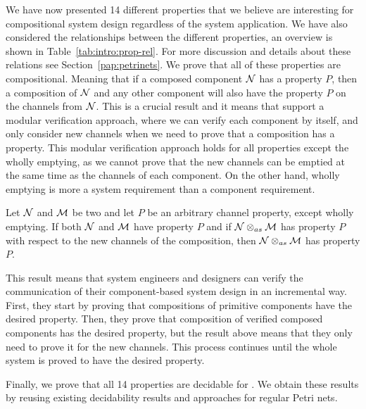 

We have now presented 14 different properties that we believe are interesting for compositional system design regardless of the system application. We have also considered the relationships between the different properties, an overview is shown in Table~\ref{tab:intro:prop-rel}. For more discussion and details about these relations see Section~\ref{pap:petrinets}.
We prove that all of these properties are compositional. Meaning that if a composed component $\mathcal{N}$ has a property $P$, then a composition of $\mathcal{N}$ and any other component will also have the property $P$ on the channels from $\mathcal{N}$.
This is a crucial result and it means that \AIOPNs support a modular verification approach, where we can verify each component by itself, and only consider new channels when we need to prove that a composition has a property. 
This modular verification approach holds for all properties except the wholly emptying, as we cannot prove that the new channels can be emptied at the same time as the channels of each component. On the other hand, wholly emptying is more a system requirement than a component requirement. 
\begin{result}
    Let $\mathcal{N}$ and $\mathcal{M}$ be two \AIOPNs and let $P$ be an arbitrary channel property, except wholly emptying.
    If both $\mathcal{N}$ and $\mathcal{M}$ have property $P$ and if $\mathcal{N} \otimes_{as} \mathcal{M}$ has property $P$ with respect to the new channels of the composition, then $\mathcal{N} \otimes_{as} \mathcal{M}$ has property $P$.
\end{result}

This result means that system engineers and designers can verify the communication of their component-based system design in an incremental way. First, they start by proving that compositions of primitive components have the desired property. Then, they prove that composition of verified composed components has the desired property, but the result above means that they only need to prove it for the new channels. This process continues until the whole system is proved to have the desired property.

Finally, we prove that all 14 properties are decidable for \AIOPNs. We obtain these results by reusing existing decidability results and approaches for regular Petri nets.

